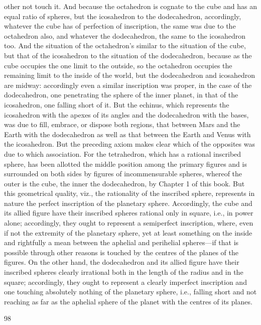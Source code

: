 \documentclass{article}
\begin{document}
other not touch it. And because the octahedron is cognate to the cube
and has an equal ratio of spheres, but the icosahedron to the
dodecahedron, accordingly, whatever the cube has of perfection of
inscription, the same was due to the octahedron also, and whatever the
dodecahedron, the same to the icosahedron too. And the situation of the
octahedron's similar to the situation of the cube, but that of the
icosahedron to the situation of the dodecahedron, because as the cube
occupies the one limit to the outside, so the octahedron occupies the
remaining limit to the inside of the world, but the dodecahedron and
icosahedron are midway: accordingly even a similar inscription was
proper, in the case of the dodecahedron, one penetrating the sphere of
the inner planet, in that of the icosahedron, one falling short of it.
But the echinus, which represents the icosahedron with the apexes of its
angles and the dodecahedron with the bases, was due to fill, embrace, or
dispose both regions, that between Mars and the Earth with the
dodecahedron as well as that between the Earth and Venus with the
icosahedron. But the preceding axiom makes clear which of the
opposites was due to which association. For the tetrahedron, which has a
rational inscribed sphere, has been allotted the middle position among
the primary figures and is surrounded on both sides by figures of
incommensurable spheres, whereof the outer is the cube, the inner the
dodecahedron, by Chapter 1 of this book. But this geometrical
quality, viz., the rationality of the inscribed sphere, represents in nature
the perfect inscription of the planetary sphere. Accordingly, the cube and
its allied figure have their inscribed spheres rational only in square, i.e.,
in power alone; accordingly, they ought to represent a semiperfect
inscription, where, even if not the extremity of the planetary sphere, yet
at least something on the inside and rightfully a mean between the
aphelial and perihelial spheres—if that is possible through other reasons
is touched by the centres of the planes of the figures. On the other hand,
the dodecahedron and its allied figure have their inscribed spheres
clearly irrational both in the length of the radius and in the square;
accordingly, they ought to represent a clearly imperfect inscription and
one touching absolutely nothing of the planetary sphere, i.e., falling
short and not reaching as far as the aphelial sphere of the planet with the
centres of its planes.


98
\end{document}
